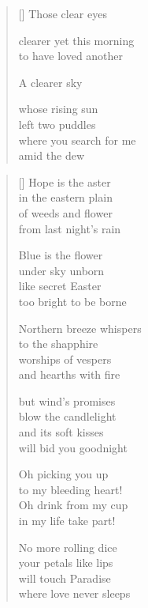 \documentclass[12pt,a4paper]{article}
\begin{document}

\newpage

\poemtitle{}

\settowidth{\versewidth}{where you search for me}

\bigskip

\begin{verse}[\versewidth]
  Those clear eyes

  clearer yet this morning \\
  to have loved another

  A clearer sky

  whose rising sun \\
  left two puddles \\
  where you search for me \\
  amid the dew
\end{verse}


\newpage

\poemtitle{}

\settowidth{\versewidth}{Northern breeze whispers}

\bigskip

\begin{verse}[\versewidth]
  Hope is the aster \\
  in the eastern plain \\
  of weeds and flower \\
  from last night's rain

  Blue is the flower \\
  under sky unborn \\
  like secret Easter \\
  too bright to be borne

  Northern breeze whispers \\
  to the shapphire \\
  worships of vespers \\
  and hearths with fire

  but wind's promises \\
  blow the candlelight \\
  and its soft kisses \\
  will bid you goodnight

  Oh picking you up \\
  to my bleeding heart! \\
  Oh drink from my cup \\
  in my life take part!

  No more rolling dice \\
  your petals like lips \\
  will touch Paradise \\
  where love never sleeps
\end{verse}
\end{document}
